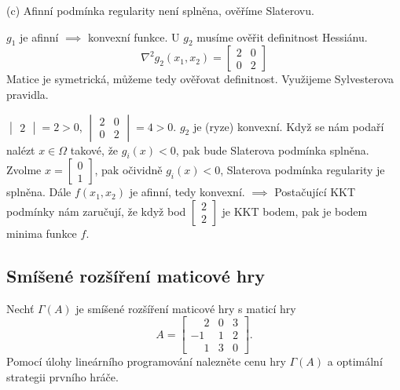 (c)
Afinní podmínka regularity není splněna, ověříme Slaterovu.

$g_1$ je afinní $\implies$ konvexní funkce. U $g_2$ musíme ověřit definitnost Hessiánu.
\[
    \nabla^2 g_2(x_1, x_2) = 
    \begin{bmatrix}
        2 & 0 \\
        0 & 2
    \end{bmatrix}
\]
Matice je symetrická, můžeme tedy ověřovat definitnost. Využijeme Sylvesterova pravidla.

$\begin{vmatrix}
    2
\end{vmatrix} = 2 > 0$, $
\begin{vmatrix}
    2 & 0 \\
    0 & 2    
\end{vmatrix} = 4 > 0$. $g_2$ je (ryze) konvexní. Když se nám podaří nalézt $x \in \Omega$ takové, že $g_i(x) < 0$, pak 
bude Slaterova podmínka splněna. Zvolme $x = \begin{bmatrix} 0 \\ 1 \end{bmatrix}$, pak očividně $g_i(x) < 0$, Slaterova
podmínka regularity je splněna. Dále $f(x_1, x_2)$ je afinní, tedy konvexní. $\implies$ Postačující KKT podmínky nám 
zaručují, že když bod $\begin{bmatrix}2 \\ 2\end{bmatrix}$ je KKT bodem, pak je bodem minima funkce $f$.

\subsection{Smíšené rozšíření maticové hry}
Nechť $\Gamma(A)$ je smíšené rozšíření maticové hry s maticí hry
\[
    A = 
    \begin{bmatrix}
        \phantom{-}2 & 0 & 3 \\
        -1 & 1 & 2 \\
        \phantom{-}1 & 3 & 0
    \end{bmatrix}.
\]
Pomocí úlohy lineárního programování nalezněte cenu hry $\Gamma(A)$ a optimální strategii prvního hráče.